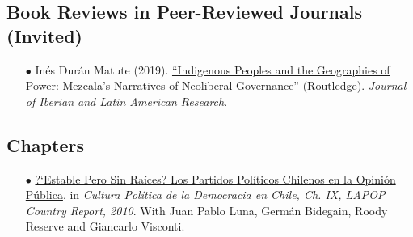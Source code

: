 

\subsection*{Book Reviews in Peer-Reviewed Journals (Invited)}

\begin{itemize}
	\item[$\bullet$] In\'es Dur\'an Matute (2019). \href{https://doi.org/10.1080/13260219.2019.1671679}{``Indigenous Peoples and the Geographies of Power: Mezcala's Narratives of Neoliberal Governance''} (Routledge). \emph{Journal of Iberian and Latin American Research}. %
\end{itemize}

\subsection*{Chapters}

\begin{itemize}
\item[$\bullet$] \href{http://www.vanderbilt.edu/lapop/chile/Chile-2010-cultura-politica.pdf}{?`Estable Pero Sin Ra\'ices? Los Partidos Pol\'iticos Chilenos en la Opini\'on P\'ublica}, in \emph{Cultura Pol\'itica de la Democracia en Chile, Ch. IX, LAPOP Country Report, 2010}. With Juan Pablo Luna, Germ\'an Bidegain, Roody Reserve and Giancarlo Visconti.
\end{itemize}



